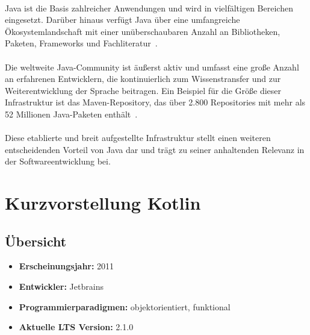 \documentclass[11pt]{article}
\begin{document}
    \\
    Java ist die Basis zahlreicher Anwendungen und wird in vielfältigen Bereichen eingesetzt.
    Darüber hinaus verfügt Java über eine umfangreiche Ökosystemlandschaft mit einer unüberschaubaren Anzahl an Bibliotheken, Paketen, Frameworks und Fachliteratur~\cite[55]{insel}.\\
    \\
    Die weltweite Java-Community ist äußerst aktiv und umfasst eine große Anzahl an erfahrenen Entwicklern, die kontinuierlich zum Wissenstransfer und zur Weiterentwicklung der Sprache beitragen.
    Ein Beispiel für die Größe dieser Infrastruktur ist das Maven-Repository, das über 2.800 Repositories mit mehr als 52 Millionen Java-Paketen enthält~\cite{maven}.\\
    \\
    Diese etablierte und breit aufgestellte Infrastruktur stellt einen weiteren entscheidenden Vorteil von Java dar und
    trägt zu seiner anhaltenden Relevanz in der Softwareentwicklung bei.\\

    \section{Kurzvorstellung Kotlin}

    \subsection{Übersicht}
    \begin{itemize}
        \item \textbf{Erscheinungsjahr:} 2011
        \item \textbf{Entwickler:} Jetbrains
        \item \textbf{Programmierparadigmen:} objektorientiert, funktional
        \item \textbf{Aktuelle LTS Version:} 2.1.0
    \end{itemize}
\end{document}
